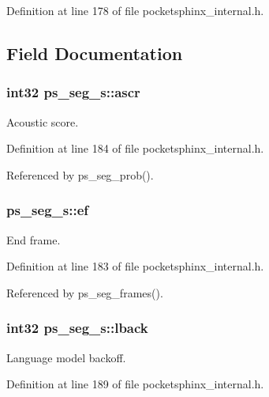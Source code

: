 Definition at line 178 of file pocketsphinx\+\_\+internal.\+h.



\subsection{Field Documentation}
\subsubsection[{ascr}]{\setlength{\rightskip}{0pt plus 5cm}int32 ps\+\_\+seg\+\_\+s\+::ascr}\label{structps__seg__s_a6f7706ec4c0d0ec8ecafaf0f29f41f4b}


Acoustic score. 



Definition at line 184 of file pocketsphinx\+\_\+internal.\+h.



Referenced by ps\+\_\+seg\+\_\+prob().

\subsubsection[{ef}]{ ps\+\_\+seg\+\_\+s\+::ef}\label{structps__seg__s_ab25ecc6af8d2695c6097cf7e934eadd4}


End frame. 



Definition at line 183 of file pocketsphinx\+\_\+internal.\+h.



Referenced by ps\+\_\+seg\+\_\+frames().

\subsubsection[{lback}]{\setlength{\rightskip}{0pt plus 5cm}int32 ps\+\_\+seg\+\_\+s\+::lback}\label{structps__seg__s_a4d86c21f1ed2dc3eb3b1b1b37ce9bb48}


Language model backoff. 



Definition at line 189 of file pocketsphinx\+\_\+internal.\+h.



